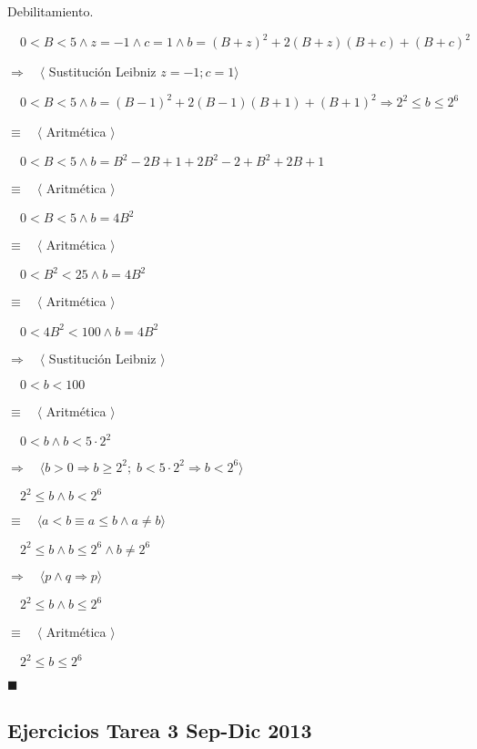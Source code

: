 \documentclass[hidelinks]{article}
\begin{document}
Debilitamiento. \par
$\quad 0 < B < 5 \land z = -1 \land c = 1 \land b = (B+z)^2 + 2(B+z)(B+c) +(B+c)^2$ \par
$\Rightarrow \quad \langle$ Sustitución Leibniz $ z = -1; c = 1 \rangle$ \par
$\quad 0 < B < 5 \land b = (B-1)^2 + 2(B-1)(B+1) +(B+1)^2 \Rightarrow 2^2 \leq b \leq 2^6$ \par
$\equiv \quad \langle$ Aritmética $ \rangle$ \par
$\quad 0 < B < 5 \land b = B^2 -2B + 1 + 2B^2 - 2 + B^2 +2B + 1 $ \par
$\equiv \quad \langle$ Aritmética $ \rangle$ \par
$\quad 0 < B < 5 \land b = 4B^2$ \par
$\equiv \quad \langle$ Aritmética $ \rangle$ \par
$\quad 0 < B^2 < 25 \land b = 4B^2$ \par
$\equiv \quad \langle$ Aritmética $ \rangle$ \par
$\quad 0 < 4B^2 < 100 \land b = 4B^2$ \par
$\Rightarrow \quad \langle$ Sustitución Leibniz $ \rangle$ \par
$\quad 0 < b < 100 $ \par
$\equiv \quad \langle$ Aritmética $ \rangle$ \par
$\quad 0 < b \land b < 5 \cdot 2^2 $ \par
$\Rightarrow \quad \langle b > 0 \Rightarrow b \geq 2^2; \; b < 5\cdot 2^2 \Rightarrow b < 2^6 \rangle$ \par
$\quad 2^2 \leq b \land b < 2^6 $ \par
$\equiv \quad \langle a < b \equiv a \leq b \land a \neq b \rangle$ \par
$\quad 2^2 \leq b \land b \leq 2^6 \land b \neq 2^6 $ \par
$\Rightarrow \quad \langle p \land q \Rightarrow p \rangle$ \par
$\quad 2^2 \leq b \land b \leq 2^6 $ \par
$\equiv \quad \langle$ Aritmética $ \rangle$ \par
$\quad 2^2 \leq b \leq 2^6 $ \par
$\blacksquare$ \par

\newpage

\subsection{Ejercicios Tarea 3 Sep-Dic 2013}
\end{document}
